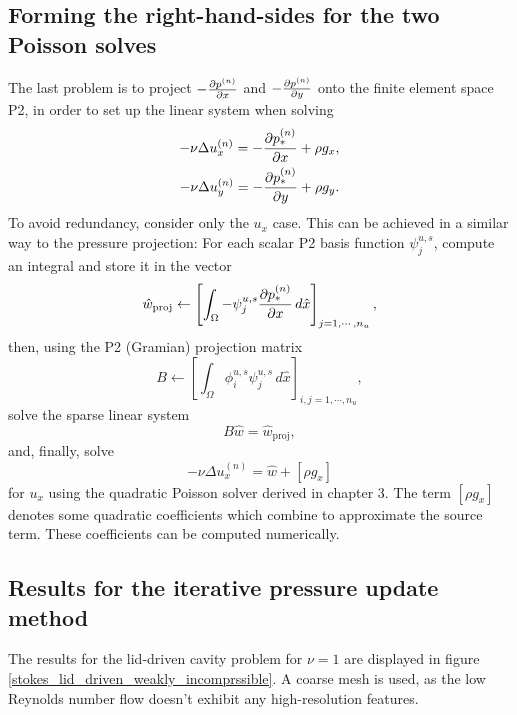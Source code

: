 \subsection{Forming the right-hand-sides for the two Poisson solves}
The last problem is to project $-\frac{\partial p^{(n)}}{\partial x}$ and $-\frac{\partial p^{(n)}}{\partial y}$ onto the finite element space P2,
in order to set up the linear system when solving
\begin{align*}
    -\nu\Delta u_x^{(n)} = -\frac{\partial p_*^{(n)}}{\partial x} + \rho g_x,\\
    -\nu\Delta u_y^{(n)} = -\frac{\partial p_*^{(n)}}{\partial y} + \rho g_y.
\end{align*}
To avoid redundancy, consider only the $u_x$ case.
This can be achieved in a similar way to the pressure projection: For each scalar P2 basis function $\psi^{u,s}_j$, compute an integral
and store it in the vector
$$
    \hat{w}_{\text{proj}} \leftarrow \left[\int_\Omega -\psi^{u,s}_j \frac{\partial p_*^{(n)}}{\partial x}\,d\hat{x}\right]_{j=1,\cdots,n_u},
$$
then, using the P2 (Gramian) projection matrix
$$
    B \leftarrow \left[ \int_\Omega \phi^{u,s}_i\psi^{u,s}_j \,d\hat{x}\right]_{i,j=1,\cdots,n_u},
$$
solve the sparse linear system
$$
    B\hat{w} = \hat{w}_{\text{proj}},
$$
and, finally, solve
$$
    -\nu\Delta u_x^{(n)} = \hat{w} + \left[\rho g_x\right]
$$
for $u_x$ using the quadratic Poisson solver derived in chapter 3. The term $\left[\rho g_x\right]$ denotes some quadratic coefficients
which combine to approximate the source term. These coefficients can be computed numerically.

\subsection{Results for the iterative pressure update method}
The results for the lid-driven cavity problem for $\nu = 1$ are displayed in figure \ref{stokes_lid_driven_weakly_incomprssible}.
A coarse mesh is used, as the low Reynolds number flow doesn't exhibit any high-resolution features.

